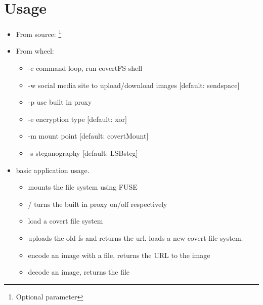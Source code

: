 \documentclass[letterpaper,12pt,openany,oneside]{sphinxmanual}
\begin{document}
\chapter{Usage}
\label{index:usage}\begin{itemize}
\item {} 
From source:  \footnote[1]{
Optional parameter
}

\item {} 
From wheel: 
\begin{itemize}
\item {} 
-c command loop, run covertFS shell

\item {} 
-w social media site to upload/download images {[}default: sendspace{]}

\item {} 
-p use built in proxy

\item {} 
-e encryption type {[}default: xor{]}

\item {} 
-m mount point {[}default: covertMount{]}

\item {} 
-s steganography {[}default: LSBsteg{]}

\end{itemize}

\item {} 
 basic application usage.
\begin{itemize}
\item {} 
 mounts the file system using FUSE

\item {} 
 /  turns the built in proxy on/off respectively

\item {} 
 load a covert file system

\item {} 
 uploads the old fs and returns the url. loads a new covert file system.

\item {} 
 encode an image with a file, returns the URL to the image

\item {} 
 decode an image, returns the file


\end{itemize}
\end{itemize}
\end{document}
